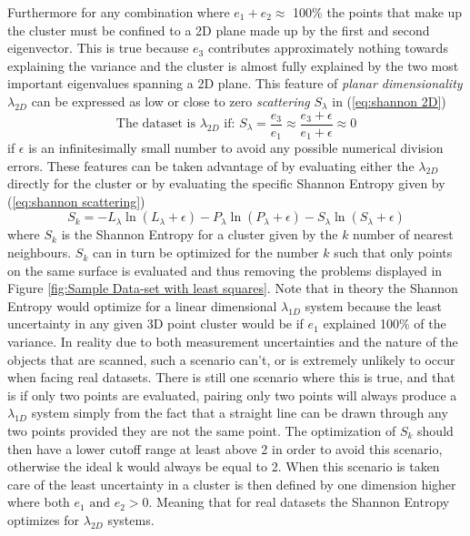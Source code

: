 \documentclass[%
]{USN-MSc}
\begin{document}
Furthermore for any combination where \(e_1 + e_2 \approx\) 100\% the points that make up the cluster must be confined to a 2D plane made up by the first and second eigenvector. This is true because \(e_3\) contributes approximately nothing towards explaining the variance and the cluster is almost fully explained by the two most important eigenvalues spanning a 2D plane. This feature of \textit{planar dimensionality} \(\lambda_{2D}\) can be expressed as low or close to zero \textit{scattering} \(S_\lambda\) in (\ref{eq:shannon 2D})
\begin{equation}
\label{eq:shannon 2D}
    \text{The dataset is }\lambda_{2D} \text{ if: } S_\lambda = \frac{e_3}{e_1} \approx \frac{e_3+ \epsilon}{e_1 + \epsilon} \approx 0
\end{equation}
if \(\epsilon\) is an infinitesimally small number to avoid any possible numerical division errors. These features can be taken advantage of by evaluating either the \(\lambda_{2D}\) directly for the cluster or by evaluating the specific Shannon Entropy given by (\ref{eq:shannon scattering})
\begin{equation}
\label{eq:shannon scattering}
    S_k = -L_\lambda\ln{(L_\lambda +\epsilon)} -P_\lambda\ln{(P_\lambda +\epsilon)} -S_\lambda\ln{(S_\lambda +\epsilon)}
\end{equation}
where \(S_k\) is the Shannon Entropy for a cluster given by the \(k\) number of nearest neighbours. \(S_k\) can in turn be optimized for the number \(k\) such that only points on the same surface is evaluated and thus removing the problems displayed in Figure \ref{fig:Sample Data-set with least squares}. Note that in theory the Shannon Entropy would optimize for a linear dimensional \(\lambda_{1D}\) system because the least uncertainty in any given 3D point cluster would be if \(e_1\) explained 100\% of the variance. In reality due to both measurement uncertainties and the nature of the objects that are scanned, such a scenario can't, or is extremely unlikely to occur when facing real datasets. There is still one scenario where this is true, and that is if only two points are evaluated, pairing only two points will always produce a \(\lambda_{1D}\) system simply from the fact that a straight line can be drawn through any two points provided they are not the same point. The optimization of \(S_k\) should then have a lower cutoff range at least above 2 in order to avoid this scenario, otherwise the ideal k would always be equal to 2. When this scenario is taken care of the least uncertainty in a cluster is then defined by one dimension higher where both \(e_1 \text{ and } e_2 > 0\). Meaning that for real datasets the Shannon Entropy optimizes for \(\lambda_{2D}\) systems.
\end{document}
